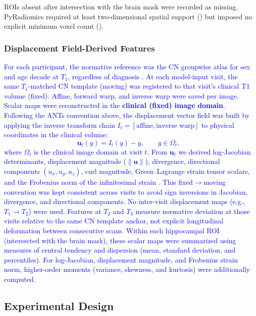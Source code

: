 \documentclass[review]{elsarticle}
\newcommand{\code}[1]{\texttt{\seqsplit{#1}}}
\begin{document}
	ROIs absent after intersection with the brain mask were recorded as missing.
	PyRadiomics required at least two-dimensional spatial support
	(\code{minimumROIDimensions=2}) but imposed no explicit minimum voxel count
	(\code{minimumROISize=None}).
	
	\subsubsection{Displacement Field-Derived Features}\label{sec:displacement-features}
	
	\textcolor{blue}{For each participant, the normative reference was the CN groupwise atlas for sex and age decade at $T_1$, regardless of diagnosis \cite{wyman-2013}. At each model-input visit, the same $T_1$-matched CN template (moving) was registered to that visit's clinical T1 volume (fixed). Affine, forward warp, and inverse warp were saved per image.
		Scalar maps were reconstructed in the \textbf{clinical (fixed) image domain}. Following the ANTs convention above, the displacement vector field was built by applying the inverse transform chain $I_t=[\text{affine},\text{inverse warp}]$ to physical coordinates in the clinical volume:
		\begin{equation}
			\mathbf{u}_t(y)=I_t(y)-y,\qquad y\in\Omega_t,
			\label{eq:dvf-clinical}
		\end{equation}
		where $\Omega_t$ is the clinical image domain at visit $t$. From $\mathbf{u}_t$ we derived log-Jacobian determinants, displacement magnitude ($\|\mathbf{u}\|$), divergence, directional components $(u_x,u_y,u_z)$, curl magnitude, Green--Lagrange strain tensor scalars, and the Frobenius norm of the infinitesimal strain \cite{bouke-2023}. This fixed$\rightarrow$moving convention was kept consistent across visits to avoid sign inversions in Jacobian, divergence, and directional components.
		No inter-visit displacement maps (e.g., $T_1\rightarrow T_2$) were used. Features at $T_2$ and $T_3$ measure normative deviation at those visits relative to the same CN template anchor, not explicit longitudinal deformation between consecutive scans.
		Within each hippocampal ROI (intersected with the brain mask), these scalar maps were summarized using measures of central tendency and dispersion (mean, standard deviation, and percentiles). For log-Jacobian, displacement magnitude, and Frobenius strain norm, higher-order moments (variance, skewness, and kurtosis) were additionally computed.}
	
	\subsection{Experimental Design}
	\label{sec:experiments}
	
\end{document}
